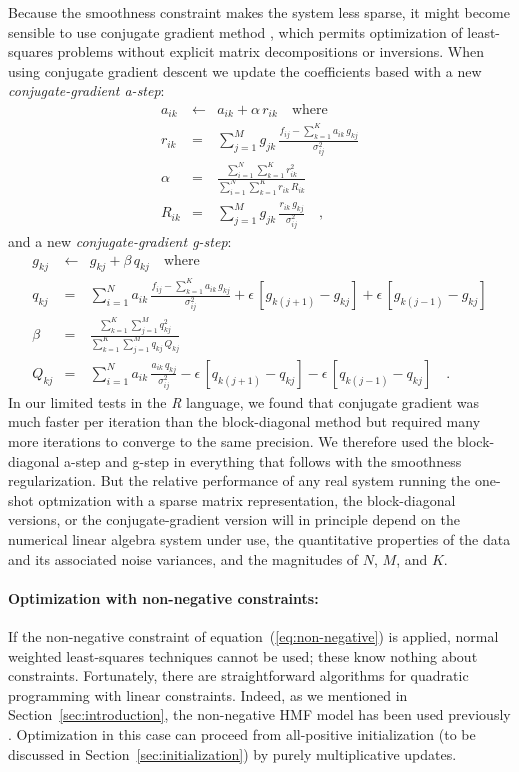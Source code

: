 \documentclass[12pt,preprint]{aastex}
\newcommand{\project}[1]{\textsl{#1}}
\newcommand{\sectionname}{Section}
\newcommand{\equationname}{equation}
\begin{document}
Because the smoothness constraint makes the system less sparse, it
might become sensible to use conjugate gradient method \citep[for
  example,][]{shewchuk}, which permits optimization of least-squares
problems without explicit matrix decompositions or inversions.  When
using conjugate gradient descent we update the coefficients based with
a new \emph{conjugate-gradient a-step}:
\begin{eqnarray}\label{eq:astep_conj}\displaystyle
a_{ik} & \gets & a_{ik}+\alpha\,r_{ik} \quad \mbox{where} \nonumber\\
r_{ik} & = & \sum_{j=1}^{M}g_{jk}\,\frac{f_{ij}-\sum_{k=1}^{K}a_{ik}\,g_{kj}}{\sigma^2_{ij}} \nonumber\\
\alpha & = & \frac{\sum_{i=1}^{N}\sum_{k=1}^{K}r^2_{ik}}{\sum_{i=1}^{N}\sum_{k=1}^{K}r_{ik}\,R_{ik}} \nonumber\\
R_{ik} & = & \sum_{j=1}^{M}g_{jk}\,\frac{r_{ik}\,g_{kj}}{\sigma^2_{ij}}
\quad ,
\end{eqnarray}
and a new \emph{conjugate-gradient g-step}:
\begin{eqnarray}\label{eq:gstep_conj}\displaystyle
g_{kj} & \gets & g_{kj}+\beta\,q_{kj} \quad \mbox{where} \nonumber\\
q_{kj} & = & \sum_{i=1}^{N}a_{ik}\,\frac{f_{ij}-\sum_{k=1}^{K}a_{ik}\,g_{kj}}{\sigma^2_{ij}}+\epsilon\,[g_{k(j+1)}-g_{kj}]+\epsilon\,[g_{k(j-1)}-g_{kj}] \nonumber\\
\beta & = & \frac{\sum_{k=1}^{K}\sum_{j=1}^{M}q^2_{kj}}{\sum_{k=1}^{K}\sum_{j=1}^{M}q_{kj}\,Q_{kj}} \nonumber\\
Q_{kj} & = & \sum_{i=1}^{N}a_{ik}\,\frac{a_{ik}\,q_{kj}}{\sigma^2_{ij}}-\epsilon\,[q_{k(j+1)}-q_{kj}]-\epsilon\,[q_{k(j-1)}-q_{kj}]
\quad .
\end{eqnarray}
In our limited tests in the \project{R} language, we found that
conjugate gradient was much faster per iteration than the
block-diagonal method but required many more iterations to converge to
the same precision.  We therefore used the block-diagonal a-step and
g-step in everything that follows with the smoothness regularization.
But the relative performance of any real system running the one-shot
optmization with a sparse matrix representation, the block-diagonal
versions, or the conjugate-gradient version will in principle depend
on the numerical linear algebra system under use, the quantitative
properties of the data and its associated noise variances, and the
magnitudes of $N$, $M$, and $K$.

\paragraph{Optimization with non-negative constraints:}
If the non-negative constraint of
\equationname~(\ref{eq:non-negative}) is applied, normal weighted
least-squares techniques cannot be used; these know nothing about
constraints.  Fortunately, there are straightforward algorithms for
quadratic programming with linear constraints.  Indeed, as we
mentioned in \sectionname~\ref{sec:introduction}, the non-negative HMF
model has been used previously \citep{blanton}.  Optimization in this
case can proceed from all-positive initialization (to be discussed in
\sectionname~\ref{sec:initialization}) by purely multiplicative
updates.
\end{document}

